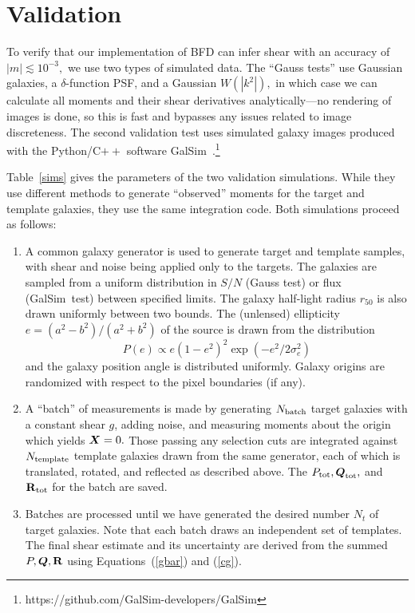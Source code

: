 \documentclass[11pt,preprint,flushrt]{aastex}
\newcommand{\vecX}{\mbox{\boldmath $X$}}
\newcommand{\vecg}{\mbox{\boldmath $g$}}
\newcommand{\vecQ}{\mbox{\boldmath $Q$}}
\newcommand{\matR}{\mbox{$\bf R$}}
\newcommand{\galsim}{{\sc GalSim}}
\begin{document}
\section{Validation}
\label{validation}
To verify that our implementation of BFD can infer shear with an
accuracy of $|m|\lesssim10^{-3},$ we use two types of simulated data.  
The ``Gauss tests'' use Gaussian galaxies, a $\delta$-function PSF,
and a Gaussian $W(|k^2|),$ in which case we can calculate all moments
and their shear derivatives analytically---no rendering of images is
done, so this is fast and bypasses any issues related to image
discreteness.  The second validation test uses simulated galaxy
images produced with the Python/C$++$ software
\galsim\
\citep{galsim}.\footnote{https://github.com/GalSim-developers/GalSim} 

Table~\ref{sims} gives the parameters of the two validation
simulations.  While they use different methods to generate
``observed'' moments for the target and template galaxies, they use
the same integration code.  Both simulations proceed as follows:
\begin{enumerate}
\item A common galaxy generator is used to generate target and
  template samples, with shear and noise being applied only to the
  targets. The galaxies are sampled from a uniform
  distribution in $S/N$ (Gauss test) or flux (\galsim\ test) between
  specified limits.  The galaxy half-light radius $r_{50}$ is also
  drawn uniformly between two bounds.  The (unlensed) ellipticity
  $e=(a^2-b^2)/(a^2+b^2)$ of the source is drawn from the distribution
\begin{equation}
\label{eprior}
P(e) \propto e (1-e^{2})^{2} \exp\left(-e^{2}/2\sigma^{2}_e\right)
\end{equation}
and the galaxy position angle is distributed uniformly.  Galaxy
origins are randomized with respect to the pixel boundaries (if any).
\item A ``batch'' of measurements is made by generating $N_{\rm
    batch}$ target galaxies with a constant shear \vecg, adding noise,
  and measuring moments about the origin which yields $\vecX=0.$
  Those passing any selection cuts are integrated against $N_{\rm
    template}$ template galaxies drawn from the same generator, each
  of which is translated, rotated, and reflected as described above.
  The $P_{\rm tot}, \vecQ_{\rm tot},$ and $\matR_{\rm tot}$ for the
  batch are saved.
\item Batches are processed until we have generated the desired 
  number $N_t$ of target galaxies.  Note that each batch draws an
  independent set of templates.  The final shear estimate and its
  uncertainty are derived from the summed $P,\vecQ,\matR$ using
  Equations~(\ref{gbar}) and (\ref{cg}).
\end{enumerate}
\end{document}
